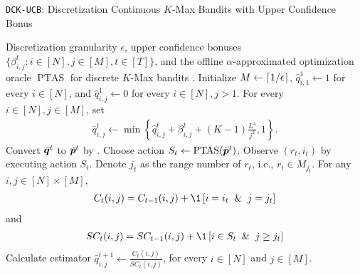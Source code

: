 \begin{algorithm}[!t]
\caption{\texttt{DCK-UCB}: Discretization Continuous $K$-Max Bandits with Upper Confidence Bonus}
\label{alg}
\begin{algorithmic}[1]
\REQUIRE Discretization granularity $\epsilon$, upper confidence bonuses $\{\beta_{i,j}^t : i \in [N], j \in [M], t \in [T]\}$, and the offline $\alpha$-approximated optimization oracle $\operatorname{PTAS}$ for discrete $K$-Max bandits \citep{chen2016combinatorial}.
\STATE Initialize $M \leftarrow \lceil 1/\epsilon \rceil$, $\hat q_{i, 1}^1 \leftarrow 1$ for every $i \in [N]$, and $\hat q_{i,j}^1 \leftarrow 0$ for every $i\in [N], j > 1$.
\STATE For every $i \in [N], j \in [M]$, set   
\begin{align}\label{eq:def-barq}
    \bar q_{i, j}^t \leftarrow \min\left\{ \hat q_{i,j}^t + \beta_{i,j}^t + (K-1)\frac{L^4}{j^2}, 1\right\}.
\end{align}
\STATE Convert $\bar {{\bm{q}}}^t$ to $\bar {{\bm{p}}}^t$ by .
\STATE \label{algline:oracle} Choose action $S_t \leftarrow \operatorname{PTAS}(\bar {{\bm{p}}}^t)$. 
\STATE Observe $(r_t,i_t)$ by executing action $S_t$. Denote $j_t$ as the range number of $r_t$, i.e., $r_t \in M_{j_t}$.
\STATE For any $i, j \in [N] \times [M]$,
\begin{align*}
    C_t(i, j) = 
        C_{t-1}(i, j) + \1\left[ i = i_t \And j = j_t \right]
\end{align*}
and
\begin{align*}
    SC_t(i, j) = 
        SC_{t-1}(i, j) + \1\left[ i \in S_t \And j \ge j_t \right]
\end{align*}
\STATE Calculate estimator $\hat q_{i,j}^{t+1} \leftarrow \frac{C_t(i,j)}{SC_t(i,j)}$, for every $i \in [N]$ and $j\in [M]$.
\ENDFOR
\end{algorithmic}
\end{algorithm}



